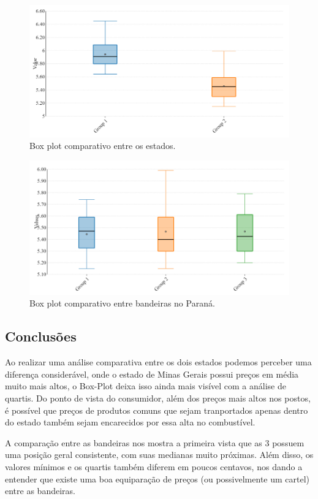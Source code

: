 \documentclass[12pt]{article}
\begin{document}
\begin{figure}[H]
    \includegraphics[width=\linewidth]{box_plot_pr.png}
    \caption{Box plot comparativo entre os estados.}
\end{figure}

\begin{figure}[H]
    \includegraphics[width=\linewidth]{box_plot_bandeiras.png}
    \caption{Box plot comparativo entre bandeiras no Paraná.}
\end{figure}

\subsection{Conclusões}

Ao realizar uma análise comparativa entre os dois estados podemos perceber uma diferença considerável, onde o estado de Minas Gerais possui preços em média muito mais altos, o Box-Plot deixa isso ainda mais visível com a análise de quartis. Do ponto de vista do consumidor, além dos preços mais altos nos postos, é possível que preços de produtos comuns que sejam tranportados apenas dentro do estado também sejam encarecidos por essa alta no combustível.

A comparação entre as bandeiras nos mostra a primeira vista que as 3 possuem uma posição geral consistente, com suas medianas muito próximas. Além disso, os valores mínimos e os quartis também diferem em poucos centavos, nos dando a entender que existe uma boa equiparação de preços (ou possivelmente um cartel) entre as bandeiras.
\end{document}
